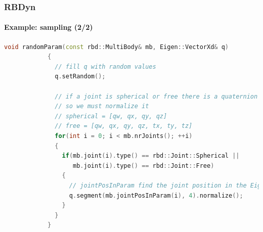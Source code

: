\documentclass{beamer}
\begin{document}
	\begin{frame}[fragile]
		\frametitle{RBDyn}
		\framesubtitle{Example: sampling (2/2)}
		\begin{lstlisting}[language=C++,basicstyle=\tiny]
			void randomParam(const rbd::MultiBody& mb, Eigen::VectorXd& q)
			{
			  // fill q with random values
			  q.setRandom();

			  // if a joint is spherical or free there is a quaternion inside
			  // so we must normalize it
			  // spherical = [qw, qx, qy, qz]
			  // free = [qw, qx, qy, qz, tx, ty, tz]
			  for(int i = 0; i < mb.nrJoints(); ++i)
			  {
			    if(mb.joint(i).type() == rbd::Joint::Spherical ||
			       mb.joint(i).type() == rbd::Joint::Free)
			    {
			      // jointPosInParam find the joint position in the Eigen3 q vector
			      q.segment(mb.jointPosInParam(i), 4).normalize();
			    }
			  }
			}
		\end{lstlisting}
	\end{frame}
\end{document}
